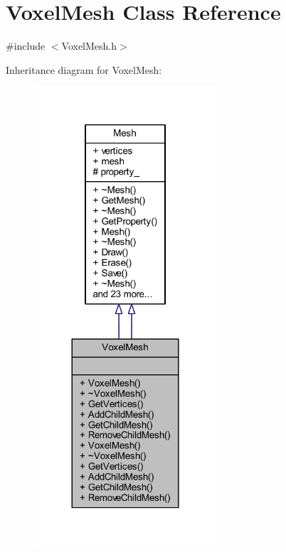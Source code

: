 \hypertarget{class_voxel_mesh}{}\section{Voxel\+Mesh Class Reference}
\label{class_voxel_mesh}


{\ttfamily \#include $<$Voxel\+Mesh.\+h$>$}



Inheritance diagram for Voxel\+Mesh\+:\nopagebreak
\begin{figure}[H]
\begin{center}
\leavevmode
\includegraphics[width=192pt]{class_voxel_mesh__inherit__graph}
\end{center}
\end{figure}


